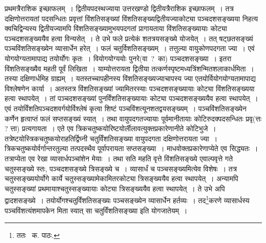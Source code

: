\documentclass[11pt, openany]{book}
\begin{document}
\noindent प्रथमत्रैराशिक इच्छाफलम्~। द्वितीयपदस्थज्याया उत्तरखण्डो द्वितीयत्रैराशिक इच्छाफलम्~। तत्र दक्षिणोत्तरायतां पदसन्धितः प्रवृत्तां विंशतिसङ्ख्यां विंशतिसङ्ख्यद्वितीयज्याकोट्या पञ्चदशसङ्ख्यया निहत्य क्वचिद्विन्यस्य द्वितीयज्यामपि विंशतिसङ्ख्यामुभयपदगतां प्रागायताया विंशतिसङ्ख्यायाः कोट्या पञ्चदशसङ्ख्ययैव हत्वा विन्यसेत्~। ते उभे फले प्रत्येकं शतत्रयसङ्ख्ये योजयेत्~। तत् षट्छतसङ्ख्यं पञ्चविंशतिसङ्ख्येन व्यासार्धेन हरेत्~। फलं चतुर्विशतिसङ्ख्यम्~। तत्तुल्या वायुकोणपदगता ज्या~। एवं योगयोग्यतामापाद्य तयोर्योगः कृतः~। वियोगयोग्ययोः पुनरे(वा~?~का) पञ्चदशसङ्ख्या~। इतरा विंशतिसङ्ख्यैव महती पूर्वं लिखिता~। याम्योत्तरायता द्वितीया तत्कर्णस्पृष्टमध्यत्रिंशन्मितशलाकार्धमिता~। तस्या दक्षिणार्धमिह ग्राह्यम्~। यतस्तच्चापहीनस्य विंशतिसङ्ख्यज्याचापस्य ज्या एतयोर्वियोगयोग्यतामापाद्य विश्लेषणेन कार्या~। अतस्तत्र विंशतिसङ्ख्यां ज्यामितरस्याः पञ्चदशसङ्ख्यायाः कोट्या विंशतिसङ्ख्यया हत्वा स्थापयेत्~। तां पञ्चदशसङ्ख्यां पुनर्विंशतिसङ्ख्यायाः कोट्या पञ्चदशसङ्ख्ययैव हत्वा स्थापयेत्~। एवं तयोर्विंशतिपञ्चदशवर्गयोर्विश्लेषं कृत्वा शिष्टं
पञ्चविंशत्यूनशतद्वयसङ्ख्यम्~। पञ्चविंशतिसङ्ख्येन कर्णेन हृत्वाप्तं फलं सप्तसङ्ख्यं स्यात्~। तथा वायुपदगतज्यायाः पूर्वमानीतायाः कोटिरुदक्पदसन्धितः प्रवृ(त्तः ? त्ता) प्रत्यगायता~। एते एव त्रिकचतुष्कयोरिष्टयोर्लीलावत्युक्तप्रकारेणानीते कोटिभुजे~। तत्रेष्टयोस्त्रिकचतुष्कयोराहतिर्द्विघ्नी चतुर्विंशतिसङ्ख्या वायुपदगता दक्षिणोत्तरायता ज्या~। त्रिकचतुष्कयोर्वर्गान्तरतुल्या तत्पदस्थैव पूर्वापरायता
सप्तसङ्ख्या~। माधवोक्तप्रकारेणाप्येते एव सिद्ध्यतः~। तत्राप्येता एव रेखा व्यासार्धपञ्चांशेन मेयाः~। तथा सति महति वृत्ते विंशतिसङ्ख्ये एवाल्पवृत्ते
गते चतुस्सङ्ख्ये स्तः, पञ्चदशसङ्ख्ये त्रिसङ्ख्ये च~। व्यासार्धं च पञ्चसङ्ख्यमित्येव विशेषः~। तत्र चतुस्सङ्ख्ययोर्योगे कार्ये चतुस्सङ्ख्यामेकामितरकोट्या त्रिसङ्ख्ययैव हत्वा स्थापयेत्~। अन्यामपि चतुस्सङ्ख्यां प्रथमायाश्चतुस्सङ्ख्यायाः कोट्या त्रिसङ्ख्ययैव हत्वा स्थापयेत्~। ते उभे अपि द्वादशसङ्ख्ये~। तयोर्योगश्चतुर्विंशतिसङ्ख्यः पञ्चसङ्ख्येन व्यासार्धेन हर्तव्यः~। तद\renewcommand{\thefootnote}{१}\footnote{ततः \textendash\ क. पाठः.}करणे
व्यासार्धस्य पञ्चविंशत्यंशमापकेन मिता स्यात् सा चतुर्विंशतिसङ्ख्या इति योगजातेयम्~। 

\newpage
\end{document}
